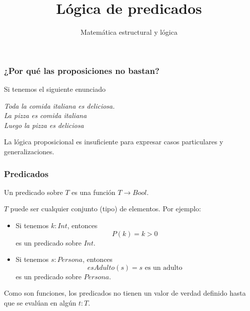 \documentclass{beamer}
\title{Lógica de predicados}
\author{Matemática estructural y lógica}
\institute{ISIS-1104}
\date{}
\begin{document}
\frame{\titlepage}

\begin{frame}[fragile]
    \frametitle{¿Por qué las proposiciones no bastan?}
    \pause
    Si tenemos el siguiente enunciado
    \pause
    \begin{center}
        \textit{Toda la comida italiana es deliciosa.\\ 
        La pizza es comida italiana\\
        Luego la pizza es deliciosa}
    \end{center}
    \pause 
    La lógica proposicional es insuficiente para expresar casos particulares y generalizaciones.
\end{frame}

\begin{frame}[fragile]
    \frametitle{Predicados}
        \pause
        Un predicado sobre $T$ es una función $T \rightarrow Bool$.
        \pause

        $T$ puede ser cualquier conjunto (tipo) de elementos. Por ejemplo:
        \pause
        \begin{itemize}
            \item Si tenemos $k: Int$, entonces $$P(k) = k > 0$$ es un predicado sobre $Int$.
            \pause
            \item Si tenemos $s:Persona$, entonces $$esAdulto(s) = s\text{ es un adulto}$$ es un predicado sobre $Persona$.
        \end{itemize}
        \pause
        Como son funciones, los predicados no tienen un valor de verdad definido hasta que se evalúan en algún $t:T$.
\end{frame}
\end{document}
